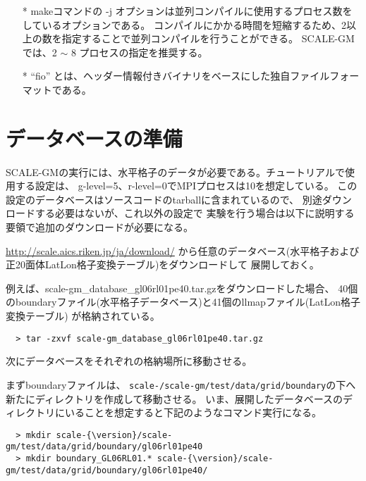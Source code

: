 \begin{itemize}
  \item[*] makeコマンドの -j オプションは並列コンパイルに使用するプロセス数をしているオプションである。
   コンパイルにかかる時間を短縮するため、2以上の数を指定することで並列コンパイルを行うことができる。
   SCALE-GMでは、2 $\sim$ 8 プロセスの指定を推奨する。
  \item[*] ``fio'' とは、ヘッダー情報付きバイナリをベースにした独自ファイルフォーマットである。
\end{itemize}


\section{データベースの準備}

SCALE-GMの実行には、水平格子のデータが必要である。チュートリアルで使用する設定は、
g-level=5、r-level=0でMPIプロセスは10を想定している。
この設定のデータベースはソースコードのtarballに含まれているので、
別途ダウンロードする必要はないが、これ以外の設定で
実験を行う場合は以下に説明する要領で追加のダウンロードが必要になる。

\noindent \url{http://scale.aics.riken.jp/ja/download/}
から任意のデータベース(水平格子および正20面体LatLon格子変換テーブル)をダウンロードして
展開しておく。

\noindent 例えば、scale-gm\_database\_gl06rl01pe40.tar.gzをダウンロードした場合、
40個のboundaryファイル(水平格子データベース)と41個のllmapファイル(LatLon格子変換テーブル)
が格納されている。
\begin{verbatim}
  > tar -zxvf scale-gm_database_gl06rl01pe40.tar.gz
\end{verbatim}


\noindent 次にデータベースをそれぞれの格納場所に移動させる。

\noindent まずboundaryファイルは、
\texttt{scale-{\version}/scale-gm/test/data/grid/boundary}の下へ新たにディレクトリを作成して移動させる。
いま、展開したデータベースのディレクトリにいることを想定すると下記のようなコマンド実行になる。

\begin{verbatim}
  > mkdir scale-{\version}/scale-gm/test/data/grid/boundary/gl06rl01pe40
  > mkdir boundary_GL06RL01.* scale-{\version}/scale-gm/test/data/grid/boundary/gl06rl01pe40/
\end{verbatim}

